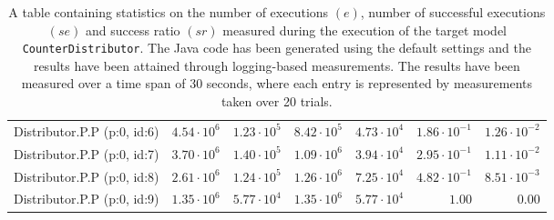 \begin{table}[htbp]
{\begin{tabular}{lrrrrrr}
\hspace{3mm}Distributor.P.P (p:0, id:6) & $4.54 \cdot 10^{6}$ & $1.23 \cdot 10^{5}$ & $8.42 \cdot 10^{5}$ & $4.73 \cdot 10^{4}$ & $1.86 \cdot 10^{-1}$ & $1.26 \cdot 10^{-2}$ \\
\hspace{3mm}Distributor.P.P (p:0, id:7) & $3.70 \cdot 10^{6}$ & $1.40 \cdot 10^{5}$ & $1.09 \cdot 10^{6}$ & $3.94 \cdot 10^{4}$ & $2.95 \cdot 10^{-1}$ & $1.11 \cdot 10^{-2}$ \\
\hspace{3mm}Distributor.P.P (p:0, id:8) & $2.61 \cdot 10^{6}$ & $1.24 \cdot 10^{5}$ & $1.26 \cdot 10^{6}$ & $7.25 \cdot 10^{4}$ & $4.82 \cdot 10^{-1}$ & $8.51 \cdot 10^{-3}$ \\
\hspace{3mm}Distributor.P.P (p:0, id:9) & $1.35 \cdot 10^{6}$ & $5.77 \cdot 10^{4}$ & $1.35 \cdot 10^{6}$ & $5.77 \cdot 10^{4}$ &               $1.00$ &               $0.00$ \\
\bottomrule
\end{tabular}
}
\caption{A table containing statistics on the number of executions $(e)$, number of successful executions $(se)$ and success ratio $(sr)$ measured during the execution of the target model \texttt{CounterDistributor}. The Java code has been generated using the default settings and the results have been attained through logging-based measurements. The results have been measured over a time span of 30 seconds, where each entry is represented by measurements taken over 20 trials.}
\label{table:frequency_results_counterdistributor_logging}
\end{table}